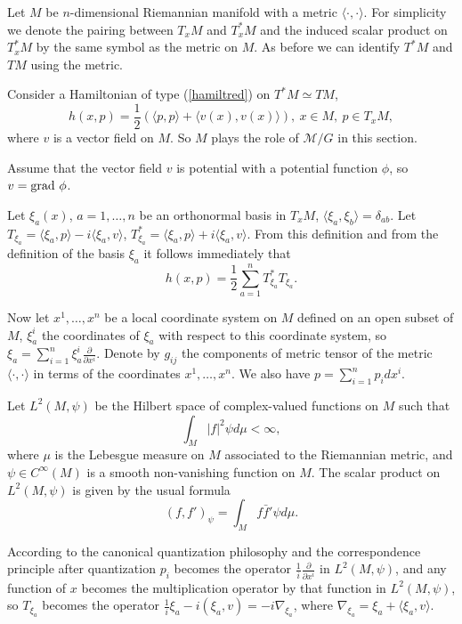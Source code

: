 \documentclass{amsart}
\begin{document}

Let $M$ be $n$-dimensional Riemannian manifold with a metric $\langle \cdot,\cdot\rangle $. For simplicity we denote the pairing between $T_xM$ and $T^*_xM$ and the induced scalar product on $T_x^*M$ by the same symbol as the metric on $M$. As before we can identify $T^*M$ and $TM$ using the metric.

Consider a Hamiltonian of type (\ref{hamiltred}) on $T^*M\simeq TM$,
\begin{equation}\label{hamM}
h(x,p)=\frac 12 (\langle p,p\rangle +\langle v(x),v(x)\rangle ),~x\in M,~p\in T_x M,	
\end{equation}
where $v$ is a vector field on $M$. So $M$ plays the role of $\mathcal{M}/G$ in this section. 

Assume that the vector field $v$ is potential with a potential function $\phi$, so $v={\rm grad}~\phi$.

Let $\xi_a(x)$, $a=1,\ldots, n$ be an orthonormal basis in $T_x M$, $\langle \xi_a,\xi_b\rangle =\delta_{ab}$.  
Let $T_{\xi_a}=\langle \xi_a,p\rangle -i\langle \xi_a,v\rangle $, $T_{\xi_a}^*=\langle \xi_a,p\rangle +i\langle \xi_a,v\rangle $. From this definition and from the definition of the basis $\xi_a$ it follows immediately that
\begin{equation}
h(x,p)=\frac12\sum_{a=1}^nT_{\xi_a}^*T_{\xi_a}.	
\end{equation}

Now let $x^1,\ldots ,x^n$ be a local coordinate system on $M$ defined on an open subset of $M$, $\xi_a^i$ the coordinates of $\xi_a$ with respect to this coordinate system, so $\xi_a=\sum_{i=1}^n\xi_a^i\frac{\partial}{\partial x^i}$. %
Denote by $g_{ij}$ the components of metric tensor of the metric $\langle \cdot,\cdot\rangle $ in terms of the coordinates $x^1,\ldots ,x^n$.  We also have $p=\sum_{i=1}^np_idx^i$. 


Let $L^2(M,\psi)$ be the Hilbert space of complex-valued functions on $M$ such that
$$
\int_M|f|^2\psi d\mu<\infty,
$$
where $\mu$ is the Lebesgue measure on $M$ associated to the Riemannian metric, and $\psi\in C^\infty(M)$ is a smooth non-vanishing function on $M$. The scalar product on $L^2(M,\psi)$ is given by the usual formula 
$$
(f,f')_\psi=\int_M f\bar{f}'\psi d\mu.
$$

According to the canonical quantization philosophy and the correspondence principle after quantization $p_i$ becomes the  operator $\frac1i\frac{\partial}{\partial x^i}$ in $L^2(M,\psi)$, and any function of $x$ becomes the multiplication operator by that function in $L^2(M,\psi)$, so $T_{\xi_a}$ becomes the operator $\frac1i\xi_a-i(\xi_a,v)=-i\nabla_{\xi_a}$, where $\nabla_{\xi_a}=\xi_a+\langle \xi_a,v\rangle $. 
\end{document}
